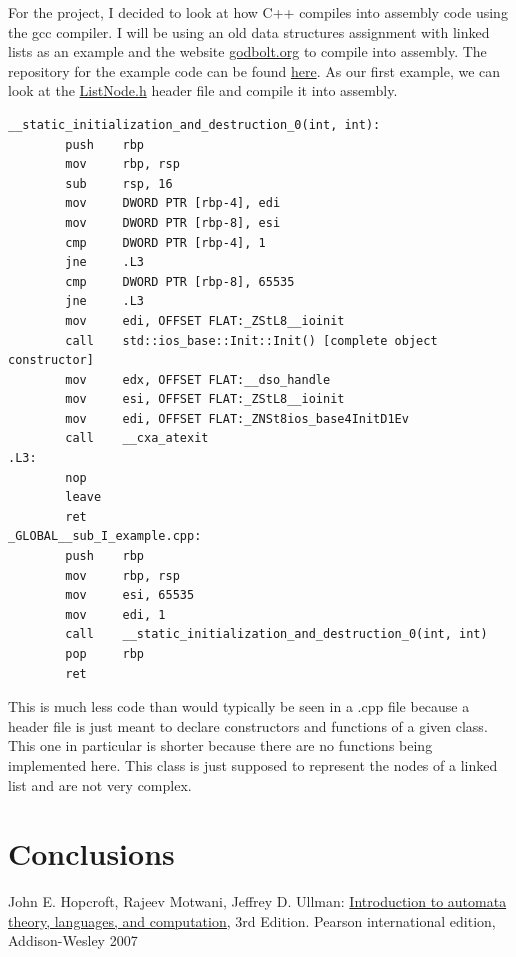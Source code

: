 \documentclass{article}
\theoremstyle{theorem}
\theoremstyle{definition}
\theoremstyle{remark}
\begin{document}
\par For the project, I decided to look at how C++ compiles into assembly code using the gcc compiler. I will be using an old data structures assignment with linked lists as an example and the website \href{https://godbolt.org/}{godbolt.org} to compile into assembly. The repository for the example code can be found \href{https://github.com/s3t6b912/CPSC350-Assignment4/tree/master/src}{here}. As our first example, we can look at the  \href{https://github.com/s3t6b912/CPSC350-Assignment4/blob/master/src/ListNode.h}{ListNode.h} header file and compile it into assembly.

\begin{lstlisting}
__static_initialization_and_destruction_0(int, int):
        push    rbp
        mov     rbp, rsp
        sub     rsp, 16
        mov     DWORD PTR [rbp-4], edi
        mov     DWORD PTR [rbp-8], esi
        cmp     DWORD PTR [rbp-4], 1
        jne     .L3
        cmp     DWORD PTR [rbp-8], 65535
        jne     .L3
        mov     edi, OFFSET FLAT:_ZStL8__ioinit
        call    std::ios_base::Init::Init() [complete object constructor]
        mov     edx, OFFSET FLAT:__dso_handle
        mov     esi, OFFSET FLAT:_ZStL8__ioinit
        mov     edi, OFFSET FLAT:_ZNSt8ios_base4InitD1Ev
        call    __cxa_atexit
.L3:
        nop
        leave
        ret
_GLOBAL__sub_I_example.cpp:
        push    rbp
        mov     rbp, rsp
        mov     esi, 65535
        mov     edi, 1
        call    __static_initialization_and_destruction_0(int, int)
        pop     rbp
        ret
\end{lstlisting}

This is much less code than would typically be seen in a .cpp file because a header file is just meant to declare constructors and functions of a given class. This one in particular is shorter because there are no functions being implemented here. This class is just supposed to represent the nodes of a linked list and are not very complex.

\section{Conclusions}\label{conclusions}

\begin{thebibliography}{99}
	John E. Hopcroft, Rajeev Motwani, Jeffrey D. Ullman:
\href{http://ce.sharif.edu/courses/94-95/1/ce414-2/resources/root/Text\%20Books/Automata/John\%20E.\%20Hopcroft,\%20Rajeev\%20Motwani,\%20Jeffrey\%20D.\%20Ullman-Introduction\%20to\%20Automata\%20Theory,\%20Languages,\%20and\%20Computations-Prentice\%20Hall\%20(2006).pdf}{Introduction to automata theory, languages, and computation,} 3rd Edition. Pearson international edition, Addison-Wesley 2007

\end{thebibliography}
\end{document}
